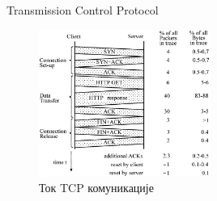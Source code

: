 \documentclass{beamer}
\begin{document}
\begin{frame}[allowframebreaks]{Transmission Control Protocol}
        \framebreak
        
        \begin{figure}
            \centering
            \includegraphics[width=0.5\textwidth]{images/tcp_http.png}
            \caption{Ток TCP комуникације}
            \label{fig:tcp_flow}
        \end{figure}
    \end{frame}
    
\end{document}
